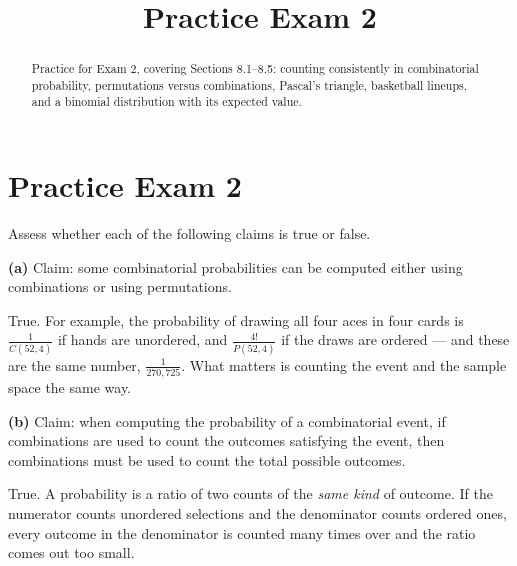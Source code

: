 \documentclass[12pt]{ximera}
\title{Practice Exam 2}
\begin{document}
\begin{abstract}
Practice for Exam 2, covering Sections 8.1--8.5: counting consistently in
combinatorial probability, permutations versus combinations, Pascal's triangle,
basketball lineups, and a binomial distribution with its expected value.
\end{abstract}
\maketitle

\section*{Practice Exam 2}

\begin{problem}
Assess whether each of the following claims is true or false.

\begin{prompt}
\textbf{(a)} Claim: some combinatorial probabilities can be computed either using
combinations or using permutations.

\begin{multipleChoice}
\end{multipleChoice}

\begin{feedback}
True. For example, the probability of drawing all four aces in four cards is
$\frac{1}{C(52,4)}$ if hands are unordered, and $\frac{4!}{P(52,4)}$ if the draws are
ordered --- and these are the same number, $\frac{1}{270{,}725}$. What matters is
counting the event and the sample space the same way.
\end{feedback}
\end{prompt}

\begin{prompt}
\textbf{(b)} Claim: when computing the probability of a combinatorial event, if
combinations are used to count the outcomes satisfying the event, then combinations
must be used to count the total possible outcomes.

\begin{multipleChoice}
\end{multipleChoice}

\begin{feedback}
True. A probability is a ratio of two counts of the \emph{same kind} of outcome. If the
numerator counts unordered selections and the denominator counts ordered ones, every
outcome in the denominator is counted many times over and the ratio comes out too
small.
\end{feedback}
\end{prompt}


\end{problem}
\end{document}
